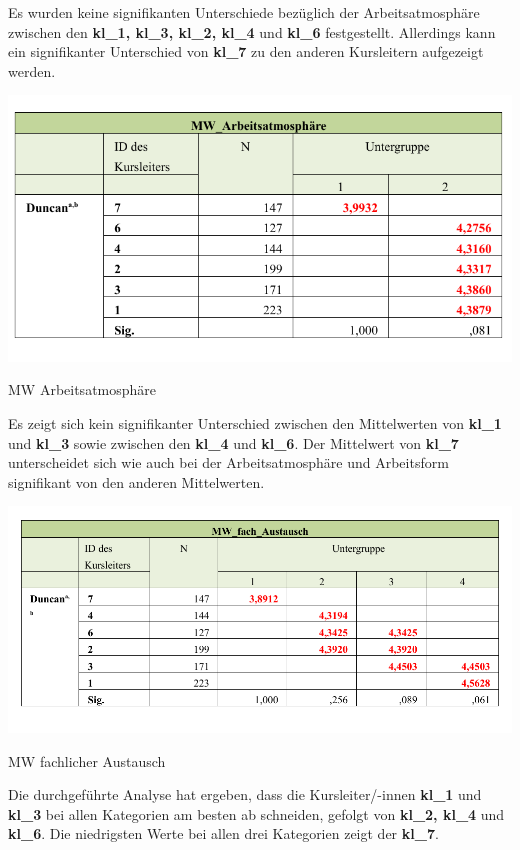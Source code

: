 \documentclass[12pt,a4paper]{article}
\begin{document}
Es wurden keine signifikanten Unterschiede bezüglich der Arbeitsatmosphäre zwischen den \textbf{kl\_1, kl\_3, kl\_2, kl\_4} und \textbf{kl\_6} festgestellt. Allerdings kann ein signifikanter Unterschied von \textbf{kl\_7} zu den anderen Kursleitern aufgezeigt werden. 


\begin{table}[!ht]
\includegraphics[scale=1.0]{tab02.pdf}
\caption{MW Arbeitsatmosphäre}
\label{tab.7}
\end{table}
\FloatBarrier


Es zeigt sich kein signifikanter Unterschied zwischen den Mittelwerten von \textbf{kl\_1} und \textbf{kl\_3} sowie zwischen den \textbf{kl\_4} und \textbf{kl\_6}. Der Mittelwert von \textbf{kl\_7} unterscheidet sich wie auch bei der Arbeitsatmosphäre und Arbeitsform signifikant von den anderen Mittelwerten.

\begin{table}[!ht]
\includegraphics[scale=0.82]{tab03.pdf}
\caption{MW fachlicher Austausch}
\label{tab.8}
\end{table}
\FloatBarrier

Die durchgeführte Analyse hat ergeben, dass die Kursleiter/-innen \textbf{kl\_1} und \textbf{kl\_3} bei allen Kategorien am besten ab schneiden, gefolgt von \textbf{kl\_2, kl\_4} und \textbf{kl\_6}. Die niedrigsten Werte bei allen drei Kategorien zeigt der \textbf{kl\_7}.
\end{document}
